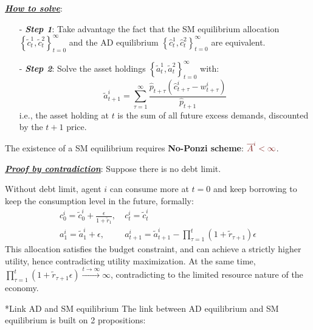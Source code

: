 \documentclass[10pt,landscape,a4paper]{article}
\makeatletter
\let\bar\overline
\renewcommand{\subsection}{\@startsection{subsection}{1}{0mm}{.2ex}{.2ex}{\small\bfseries}}
\makeatother
\begin{document}
\begin{multicols*}{3}
\underline{\textit{\textbf{How to solve}}}:
\begin{itemize}
    \item[-] \textbf{\textit{Step 1}}: Take advantage the fact that the SM equilibrium allocation $\left\{\tilde{c}^1_t,\tilde{c}^2_t\right\}^{\infty}_{t=0}$ and the AD equilibrium $\left\{\hat{c}^1_t,\hat{c}^2_t\right\}^{\infty}_{t=0}$ are equivalent.
    \item[-] \textbf{\textit{Step 2}}: Solve the asset holdings $\left\{\tilde{a}^1_t,\tilde{a}^2_t\right\}^{\infty}_{t=0}$ with: $$\tilde{a}^i_{t+1}=\sum^{\infty}_{\tau=1}\frac{\hat{p}_{t+\tau}\left(\hat{c}^i_{t+\tau}-w^i_{t+\tau}\right)}{\hat{p}_{t+1}}$$
    i.e., the asset holding at $t$ is the sum of all future excess demands, discounted by the $t+1$ price.
\end{itemize}

The existence of a SM equilibrium requires \textbf{\color{myred}No-Ponzi scheme}: $\color{myred}\bar{A}^i<\infty$. 

\underline{\textit{\textbf{Proof by contradiction}}}: Suppose there is no debt limit.
        
Without debt limit, agent $i$ can consume more at $t=0$ and keep borrowing to keep the consumption level in the future, formally:
\begin{align*}
    c_0^i=\tilde{c}_0^i+\frac{\epsilon}{1+\tilde{r}_1},&\ c_t^i=\tilde{c}_t^i\\
    a_1^i=\tilde{a}_1^i+\epsilon,&\ a_{t+1}^i=\tilde{a}_{t+1}^i-\prod^t_{\tau=1}\left(1+\tilde{r}_{\tau+1}\right)\epsilon
\end{align*}
This allocation satisfies the budget constraint, and can achieve a strictly higher utility, hence contradicting utility maximization. At the same time, $\prod^t_{\tau=1}\left(1+\tilde{r}_{\tau+1}\epsilon\right)\xrightarrow{t\rightarrow\infty}\infty$, contradicting to the limited resource nature of the economy.

\subsection*{Link AD and SM equilibrium}
The link between AD equilibrium and SM equilibrium is built on 2 propositions:


\end{multicols*}
\end{document}
